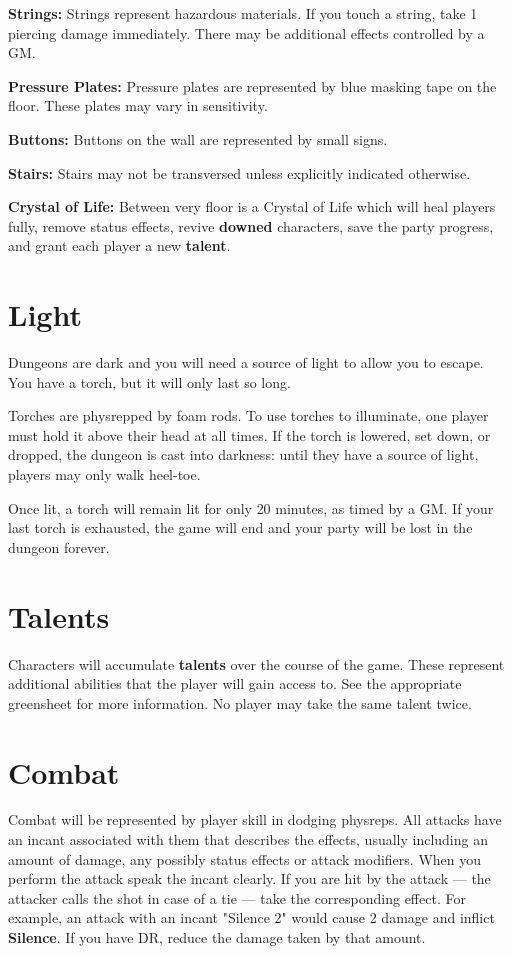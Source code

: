 \documentclass[green]{grimrock}
\begin{document}
{\bf Strings:} Strings represent hazardous materials.  If you touch a string, take 1 piercing damage immediately.  There may be additional effects controlled by a GM.

{\bf Pressure Plates:} Pressure plates are represented by blue masking tape on the floor.  These plates may vary in sensitivity.

{\bf Buttons:} Buttons on the wall are represented by small signs.

{\bf Stairs:} Stairs may not be transversed unless explicitly indicated otherwise.

{\bf Crystal of Life:}  Between very floor is a Crystal of Life which will heal players fully, remove status effects, revive {\bf downed} characters, save the party progress, and grant each player a new {\bf talent}.

\section{Light}

Dungeons are dark and you will need a source of light to allow you to escape.  You have a torch, but it will only last so long.

Torches are physrepped by foam rods.  To use torches to illuminate, one player must hold it above their head at all times.  If the torch is lowered, set down, or dropped, the dungeon is cast into darkness: until they have a source of light, players may only walk heel-toe.

Once lit, a torch will remain lit for only 20 minutes, as timed by a GM.  If your last torch is exhausted, the game will end and your party will be lost in the dungeon forever.

\section{Talents}

Characters will accumulate {\bf talents} over the course of the game.  These represent additional abilities that the player will gain access to.  See the appropriate greensheet for more information.  No player may take the same talent twice.

\section{Combat}

Combat will be represented by player skill in dodging physreps.  All attacks have an incant associated with them that describes the effects, usually including an amount of damage, any possibly status effects or attack modifiers.  When you perform the attack speak the incant clearly.  If you are hit by the attack --- the attacker calls the shot in case of a tie --- take the corresponding effect.  For example, an attack with an incant "Silence 2" would cause 2 damage and inflict {\bf Silence}.  If you have DR, reduce the damage taken by that amount.
\end{document}

